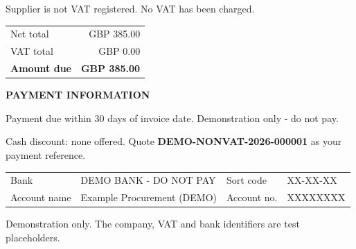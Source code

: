 \documentclass[10pt,a4paper]{article}
\begin{document}
\begin{minipage}{\textwidth}

{\small\color{muted}Supplier is not VAT registered. No VAT has been charged.}

\vspace{3mm}
\begin{flushright}
\begin{tabular}{@{}lr@{}}
Net total & GBP 385.00 \\
VAT total & GBP 0.00 \\
\midrule
{\large\bfseries Amount due} & {\large\bfseries GBP 385.00} \\
\end{tabular}
\end{flushright}
\vspace{3mm}
{\small\bfseries PAYMENT INFORMATION}\par
{\small Payment due within 30 days of invoice date. Demonstration only - do not pay.\par
Cash discount: none offered. Quote \textbf{DEMO-NONVAT-2026-000001} as your payment reference.}
\vspace{2mm}
\colorbox{pale}{\parbox{\dimexpr\textwidth-2\fboxsep\relax}{\small
\begin{tabularx}{\linewidth}{@{}l X l X@{}}
Bank & DEMO BANK - DO NOT PAY & Sort code & XX-XX-XX \\
Account name & Example Procurement (DEMO) & Account no. & XXXXXXXX \\
\end{tabularx}}}

\par{\footnotesize\color{demo}Demonstration only. The company, VAT and bank identifiers are test placeholders.}

\end{minipage}
\end{document}
